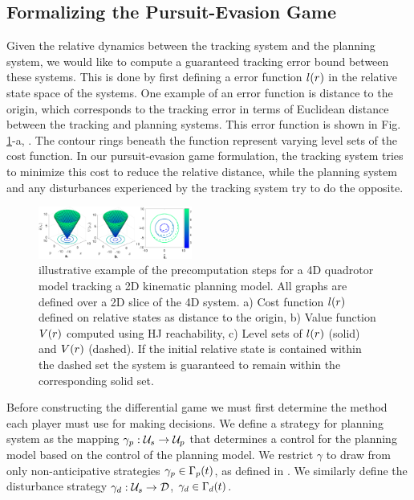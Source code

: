 \subsection{Formalizing the Pursuit-Evasion Game}
Given the relative dynamics between the tracking system and the planning system, we would like to compute a guaranteed tracking error bound between these systems. This is done by first defining a error function $l(r)$ in the relative state space of the systems. One example of an error function is distance to the origin, which corresponds to the tracking error in terms of Euclidean distance between the tracking and planning systems. This error function is shown in Fig. \ref{fig:quad4D_example}-a, . The contour rings beneath the function represent varying level sets of the cost function. In our pursuit-evasion game formulation, the tracking system tries to minimize this cost to reduce the relative distance, while the planning system and any disturbances experienced by the tracking system try to do the opposite.
\begin{figure}
	\centering
	\includegraphics[width=0.45\textwidth]{fig/quad4D_example}
	\caption{illustrative example of the precomputation steps for a 4D quadrotor model tracking a 2D kinematic planning model. All graphs are defined over a 2D slice of the 4D system. a) Cost function $l(r)$ defined on relative states as distance to the origin, b) Value function $V(r)$ computed using HJ reachability, c) Level sets of $l(r)$ (solid) and $V(r)$ (dashed). If the initial relative state is contained within the dashed set the system is guaranteed to remain within the corresponding solid set.}
	\label{fig:quad4D_example}
	\vspace{-.2in}
\end{figure} 

Before constructing the differential game we must first determine the method each player must use for making decisions. We define a strategy for planning system as the mapping $\gamma_{p} : \mathcal{U}_s \rightarrow \mathcal{U}_p$ that determines a control for the planning model based on the control of the planning model. We restrict $\gamma$ to draw from only non-anticipative strategies $\gamma_{p} \in \Gamma_p(t)$, as defined in \cite{Mitchell05}. We similarly define the disturbance strategy $\gamma_{d}: \mathcal{U}_s \rightarrow \mathcal{D}$, $\gamma_{d} \in \Gamma_d(t)$.

